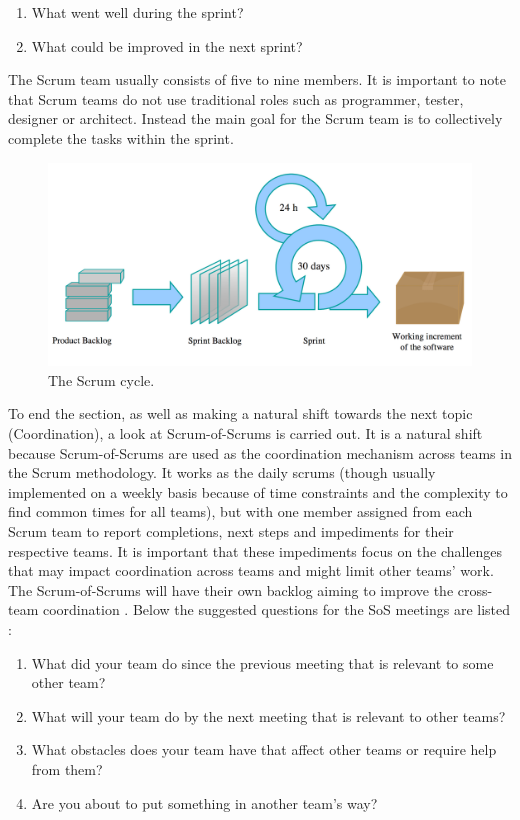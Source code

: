 \begin{enumerate}
  \item What went well during the sprint?
  \item What could be improved in the next sprint?
\end{enumerate}

The Scrum team usually consists of five to nine members. It is important to note that Scrum teams do not use traditional roles such as programmer, tester, designer or architect. Instead the main goal for the Scrum team is to collectively complete the tasks within the sprint.

\begin{figure}[ht!]
\centering
\includegraphics[width=150mm]{images/chapters/development_models/Scrum.png}
\caption{The Scrum cycle.}
\label{scrum}
\end{figure}

To end the section, as well as making a natural shift towards the next topic (Coordination), a look at Scrum-of-Scrums is carried out. It is a natural shift because Scrum-of-Scrums are used as the coordination mechanism across teams in the Scrum methodology. It works as the daily scrums (though usually implemented on a weekly basis because of time constraints and the complexity to find common times for all teams), but with one member assigned from each Scrum team to report completions, next steps and impediments for their respective teams. It is important that these impediments focus on the challenges that may impact coordination across teams and might limit other teams' work. The Scrum-of-Scrums will have their own backlog aiming to improve the cross-team coordination \cite{Sutherland2001}. Below the suggested questions for the SoS meetings are listed \cite{Cohn2007}:

\begin{enumerate}
  \item What did your team do since the previous meeting that is relevant to some other team?
  \item What will your team do by the next meeting that is relevant to other teams?
  \item What obstacles does your team have that affect other teams or require help from them?
  \item Are you about to put something in another team's way?
\end{enumerate}


